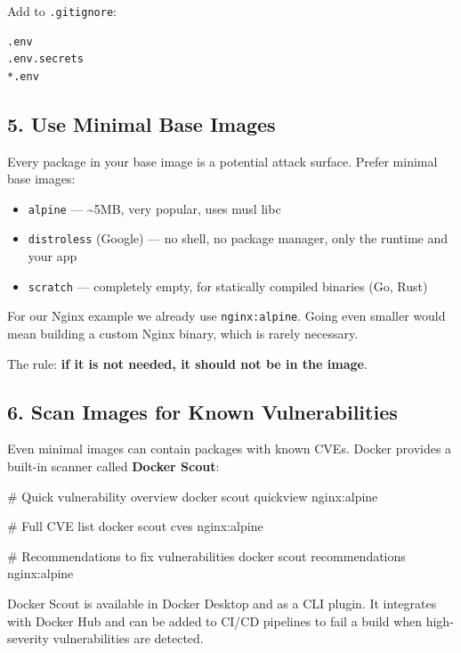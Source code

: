 \documentclass[11pt,american,a4paper,openany]{book}
\providecommand{\tightlist}{%
  \setlength{\itemsep}{2pt}\setlength{\parskip}{0pt}}
\newenvironment{Shaded}{}{}
\newcommand{\NormalTok}[1]{#1}
\begin{document}
Add to \texttt{.gitignore}:

\begin{verbatim}
.env
.env.secrets
*.env
\end{verbatim}

\subsection{5. Use Minimal Base Images}\label{use-minimal-base-images}

Every package in your base image is a potential attack surface. Prefer
minimal base images:

\begin{itemize}
\tightlist
\item
  \texttt{alpine} --- \textasciitilde5MB, very popular, uses musl libc
\item
  \texttt{distroless} (Google) --- no shell, no package manager, only
  the runtime and your app
\item
  \texttt{scratch} --- completely empty, for statically compiled
  binaries (Go, Rust)
\end{itemize}

For our Nginx example we already use \texttt{nginx:alpine}. Going even
smaller would mean building a custom Nginx binary, which is rarely
necessary.

The rule: \textbf{if it is not needed, it should not be in the image}.

\subsection{6. Scan Images for Known
Vulnerabilities}\label{scan-images-for-known-vulnerabilities}

Even minimal images can contain packages with known CVEs. Docker
provides a built-in scanner called \textbf{Docker Scout}:

\begin{Shaded}
\begin{Highlighting}[]
\NormalTok{\# Quick vulnerability overview}
\NormalTok{docker scout quickview nginx:alpine}

\NormalTok{\# Full CVE list}
\NormalTok{docker scout cves nginx:alpine}

\NormalTok{\# Recommendations to fix vulnerabilities}
\NormalTok{docker scout recommendations nginx:alpine}
\end{Highlighting}
\end{Shaded}

Docker Scout is available in Docker Desktop and as a CLI plugin. It
integrates with Docker Hub and can be added to CI/CD pipelines to fail a
build when high-severity vulnerabilities are detected.
\end{document}
